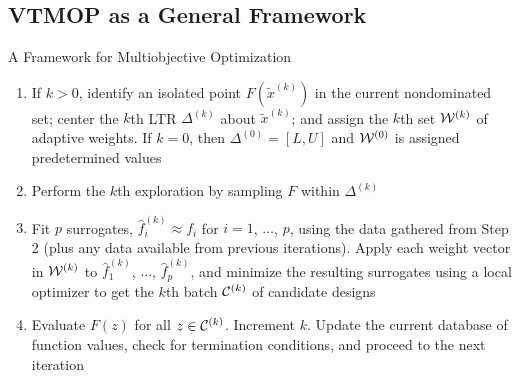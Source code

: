 \documentclass[xcolor=dvipsnames]{beamer}
\begin{document}
\subsection{VTMOP as a General Framework}
\begin{frame}{A Framework for Multiobjective Optimization}
\begin{enumerate}
\item
If $k>0$, identify an
isolated point $F({\tilde x}^{(k)})$ in the
current nondominated set; center the $k$th LTR $\Delta^{(k)}$ about
${\tilde x}^{(k)}$; and assign the $k$th set ${\cal W}^{(k)}$ of
adaptive weights.
If $k=0$, then 
$\Delta^{(0)} = [L,U]$ and ${\cal W}^{(0)}$ is assigned predetermined values
\item
Perform the $k$th exploration by sampling $F$ within $\Delta^{(k)}$
\item
Fit $p$ surrogates, ${\hat f}^{(k)}_i \approx f_i$ for
$i=1$, $\ldots$, $p$,
using the data gathered from Step 2 (plus any data available from previous
iterations).
Apply each weight vector in ${\cal W}^{(k)}$ to ${\hat f}^{(k)}_1$, $\ldots$,
${\hat f}^{(k)}_p$,
and minimize the resulting surrogates using a local optimizer to get
the $k$th batch ${\cal C}^{(k)}$ of candidate designs
\item
Evaluate $F(z)$ for all $z \in {\cal C}^{(k)}$.
Increment $k$.
Update the current database of function values, check for termination
conditions, and proceed
to the next iteration
\end{enumerate}
\end{frame}
\end{document}
